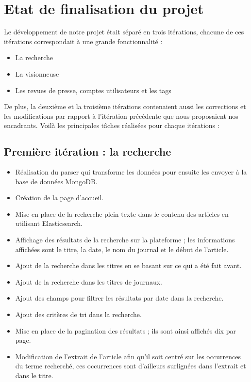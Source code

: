 \section{Etat de finalisation du projet}
\label{sec:finalis}


Le développement de notre projet était séparé en trois itérations, chacune de ces itérations correspondait à une grande fonctionnalité :
\begin{itemize}
\item La recherche
\item La visionneuse
\item Les revues de presse, comptes utilisateurs et les tags
\end{itemize}

De plus, la deuxième et la troisième itérations contenaient aussi les corrections et les modifications par rapport à l'itération précédente que nous proposaient nos encadrants. Voilà les principales tâches réalisées pour chaque itérations :

\subsection{Première itération : la recherche}

\begin{itemize}
\setlength\itemsep{1em}

	\item Réalisation du parser qui transforme les données pour ensuite les envoyer à la base de données MongoDB.

	\item Création de la page d'accueil.

	\item Mise en place de la recherche plein texte dans le contenu des articles en utilisant Elasticsearch.

	\item Affichage des résultats de la recherche sur la plateforme ; les informations affichées sont le titre, la date, le nom du journal et le début de l'article.

	\item Ajout de la recherche dans les titres en se basant sur ce qui a été fait avant.

	\item Ajout de la recherche dans les titres de journaux.

	\item Ajout des champs pour filtrer les résultats par date dans la recherche.

	\item Ajout des critères de tri dans la recherche.

	\item Mise en place de la pagination des résultats ; ils sont ainsi affichés dix par page.

	\item Modification de l'extrait de l'article afin qu'il soit centré sur les occurrences du terme recherché, ces occurrences sont d'ailleurs surlignées dans l'extrait et dans le titre.

\end{itemize}

